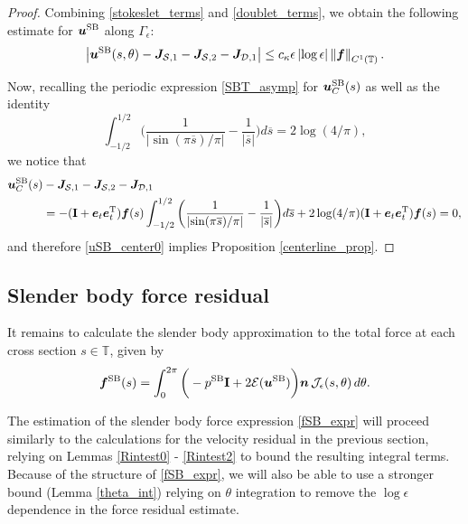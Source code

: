 \documentclass[11pt]{article}
\numberwithin{equation}{section}
\newcommand{\T}{\mathbb{T}}
\newcommand{\E}{\mathcal{E}}
\newcommand{\bars}{\overline s}
\newcommand{\bu}{\bm{u}}
\newcommand{\be}{\bm{e}}
\newcommand{\ts}{\thinspace}
\newcommand{\SB}{{\rm SB}}
\newcommand{\abs}[1]{\left\lvert #1 \right\rvert}
\newcommand{\norm}[1]{\left\lVert #1 \right\rVert}
\newcommand{\mc}[1]{\mathcal{#1}}
\theoremstyle{definition}
\begin{document}
\begin{proof}
Combining \eqref{stokeslet_terms} and \eqref{doublet_terms}, we obtain the following estimate for $\bu^{\SB}$ along $\Gamma_\epsilon$:
\begin{equation}\label{uSB_center0}
\abs{\bu^{\SB}(s,\theta) - \bm{J}_{\mc{S},1}- \bm{J}_{\mc{S},2}- \bm{J}_{\mc{D},1}} \le c_\kappa\epsilon\abs{\log\epsilon}\norm{\bm{f}}_{C^1(\T)}.
\end{equation}

Now, recalling the periodic expression \eqref{SBT_asymp} for $\bu^{\SB}_C(s)$ as well as the identity
\[ \int_{-1/2}^{1/2}\bigg(\frac{1}{\abs{\sin(\pi\bars)/\pi}}-\frac{1}{\abs{\bars}} \bigg)d\bars = 2\log(4/\pi),\]
we notice that
\begin{align*}
\bu^{\SB}_C(s)& - \bm{J}_{\mc{S},1}- \bm{J}_{\mc{S},2}- \bm{J}_{\mc{D},1} \\
&= -({\bf I}+\be_t\be_t^{\rm T})\bm{f}(s)\int_{-1/2}^{1/2}\bigg(\frac{1}{\abs{\sin(\pi\bars)/\pi}} -\frac{1}{\abs{\bars}} \bigg)d\bars + 2\log(4/\pi) ({\bf I}+\be_t\be_t^{\rm T})\bm{f}(s) =0,
\end{align*}
and therefore \eqref{uSB_center0} implies Proposition \ref{centerline_prop}.

\end{proof}


\subsection{Slender body force residual}\label{SBforce_res}
It remains to calculate the slender body approximation to the total force at each cross section $s\in \T$, given by
\begin{equation}\label{fSB_expr}
{\bm f}^{\SB}(s)= \int_0^{2\pi}\bigg(-p^{\SB}{\bf I}+2\E(\bu^{\SB}) \bigg) {\bm n} \ts \mc{J}_\epsilon(s,\theta)\ts d\theta.
\end{equation}

The estimation of the slender body force expression \eqref{fSB_expr} will proceed similarly to the calculations for the velocity residual in the previous section, relying on Lemmas \ref{Rintest0} - \ref{Rintest2} to bound the resulting integral terms. Because of the structure of \eqref{fSB_expr}, we will also be able to use a stronger bound (Lemma \ref{theta_int}) relying on $\theta$ integration to remove the $\log\epsilon$ dependence in the force residual estimate.  \\
\end{document}
